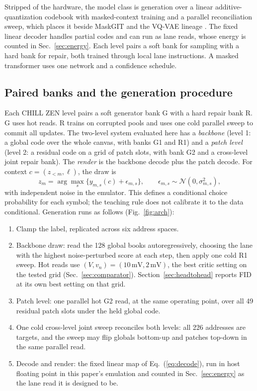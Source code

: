 \documentclass[reprint,amsmath,amssymb,aps,nofootinbib]{revtex4-2}
\begin{document}
Stripped of the hardware, the model class is generation over a linear
additive-quantization codebook with masked-context training and a
parallel reconciliation sweep, which places it beside MaskGIT
\cite{chang2022maskgit} and the VQ-VAE lineage
\cite{vandenoord2017vqvae}. The fixed linear decoder handles partial codes and can run as lane
reads, whose energy is counted in Sec.~\ref{sec:energy}. Each level pairs a soft bank for sampling with a hard bank for repair,
both trained through local lane instructions. A masked transformer uses
one network and a confidence schedule.

\subsection{Paired banks and the generation procedure}\label{sec:banks}

Each CHILL ZEN level pairs a soft generator bank G with a hard repair
bank R. G uses hot reads. R trains on corrupted pools and uses one cold
parallel sweep to commit all updates. The two-level system evaluated here has a
\emph{backbone} (level 1: a global code over the whole canvas, with
banks G1 and R1) and a \emph{patch level} (level 2: a residual code on
a grid of patch slots, with bank G2 and a cross-level joint repair
bank). The \emph{render} is the backbone decode plus the patch decode.
For context $c=(z_{<m},\ell)$, the draw is
\begin{equation}
 z_m = \arg\max_s\{y_{m,s}(c)+\epsilon_{m,s}\},
 \qquad \epsilon_{m,s}\sim\mathcal{N}(0,\sigma_{m,s}^2),
\end{equation}
with independent noise in the emulator. This defines a conditional
choice probability for each symbol; the teaching rule does not
calibrate it to the data conditional. Generation runs as follows
(Fig.~\ref{fig:arch}):

\begin{enumerate}
\item Clamp the label, replicated across six address spaces.
\item Backbone draw: read the 128 global books autoregressively,
  choosing the lane with the highest noise-perturbed score at each step,
  then apply one cold R1 sweep. Hot reads use $(V, v_n) =
  (10\,\mathrm{mV}, 2\,\mathrm{mV})$, the best critic setting on the
  tested grid (Sec.~\ref{sec:comparator}). Section~\ref{sec:headtohead}
  reports FID at its own best setting on that grid.
\item Patch level: one parallel hot G2 read, at the same operating
  point, over all 49 residual patch slots under the held global code.
\item One cold cross-level joint sweep reconciles both levels: all
  226 addresses are targets, and the sweep may flip globals bottom-up
  and patches top-down in the same parallel read.
\item Decode and render: the fixed linear map of Eq.~(\ref{eq:decode}),
  run in host floating point in this paper's emulation and counted in
  Sec.~\ref{sec:energy} as the lane read it is designed to be.
\end{enumerate}
\end{document}
